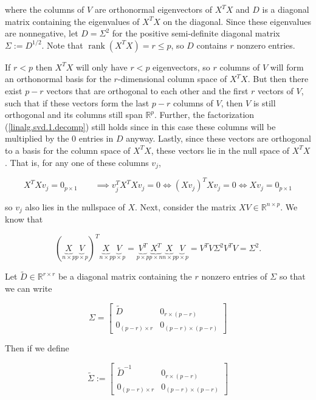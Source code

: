 where the columns of \(V\) are orthonormal eigenvectors of \(X^TX\) and \(D\) is a diagonal matrix containing the eigenvalues of \(X^TX\) on the diagonal. Since these eigenvalues are nonnegative, let \(D = \Sigma^2\) for the positive semi-definite diagonal matrix \(\Sigma := D^{1/2}\). Note that \(\operatorname{rank}(X^TX) = r \leq p\), so \(D\) contains \( r\) nonzero entries. 

If \(r < p\) then \(X^TX\) will only have \(r < p\) eigenvectors, so \(r\) columns of \(V\) will form an orthonormal basis for the \(r\)-dimensional column space of \(X^TX\). But then there exist \(p - r\) vectors that are orthogonal to each other and the first \(r\) vectors of \(V\), such that if these vectors form the last \(p-r\) columns of \(V\), then \(V\) is still orthogonal and its columns still span \(\mathbb{R}^p\). Further, the factorization (\ref{linalg.svd.1.decomp}) still holds since in this case these columns will be multiplied by the 0 entries in \(D\) anyway. Lastly, since these vectors are orthogonal to a basis for the column space of \(X^TX\), these vectors lie in the null space of \(X^TX\). That is, for any one of these columns \(v_j\),

\[
X^TX v_j = 0_{p \times 1} \qquad \implies v_j^T X^T X v_j = 0  \iff (X v_j )^T Xv _j = 0 \iff Xv _j  = 0_{p \times 1} 
\]

so \(v_j\) also lies in the nullspace of \(X\). Next, consider the matrix \(XV \in \mathbb{R}^{n \times p}\). We know that

\begin{equation}\label{linalg.svd.2.decomp}
(\underbrace{X}_{n \times p} \underbrace{V}_{p \times p})^T \underbrace{X}_{n \times p} \underbrace{V}_{p \times p} = \underbrace{V^T}_{p \times p} \underbrace{X^T}_{p \times n}  \underbrace{X}_{n \times p} \underbrace{V}_{p \times p} =  V^T V \Sigma^2 V^TV = \Sigma^2.
\end{equation}

Let \(\tilde{D} \in \mathbb{R}^{r \times r} \) be a diagonal matrix containing the \(r\) nonzero entries of \(\Sigma\) so that we can write

\[
\Sigma = \begin{bmatrix} 
\tilde{D} & 0_{r \times (p - r)} \\
0_{(p-r) \times r}  & 0_{(p-r) \times (p-r)}
\end{bmatrix}
\]

Then if we define

\[
\tilde{\Sigma} :=  \begin{bmatrix} 
\tilde{D}^{-1} & 0_{r \times (p - r)} \\
0_{(p-r) \times r}  & 0_{(p-r) \times (p-r)}
\end{bmatrix}
\]

